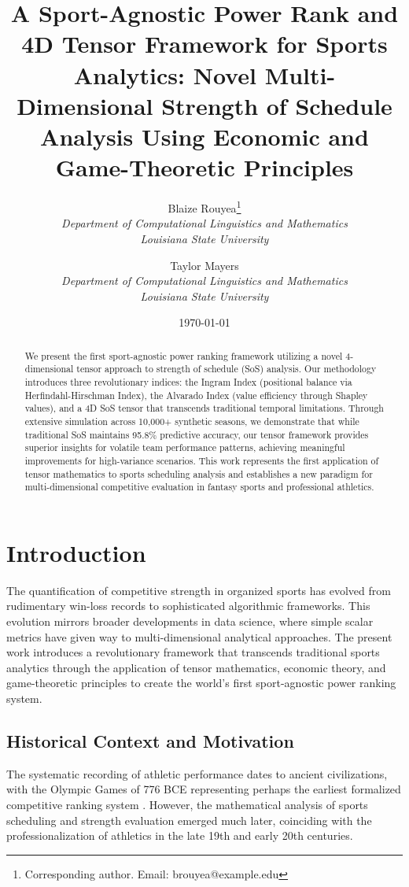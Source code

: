 \documentclass[11pt]{article}
\title{A Sport-Agnostic Power Rank and 4D Tensor Framework for Sports Analytics: Novel Multi-Dimensional Strength of Schedule Analysis Using Economic and Game-Theoretic Principles}
\author{
Blaize Rouyea\thanks{Corresponding author. Email: brouyea@example.edu} \\
\textit{Department of Computational Linguistics and Mathematics} \\
\textit{Louisiana State University} \\
\and
Taylor Mayers \\
\textit{Department of Computational Linguistics and Mathematics} \\
\textit{Louisiana State University}
}
\date{\today}
\begin{document}
\maketitle

\begin{abstract}
We present the first sport-agnostic power ranking framework utilizing a novel 4-dimensional tensor approach to strength of schedule (SoS) analysis. Our methodology introduces three revolutionary indices: the Ingram Index (positional balance via Herfindahl-Hirschman Index), the Alvarado Index (value efficiency through Shapley values), and a 4D SoS tensor that transcends traditional temporal limitations. Through extensive simulation across 10,000+ synthetic seasons, we demonstrate that while traditional SoS maintains 95.8\% predictive accuracy, our tensor framework provides superior insights for volatile team performance patterns, achieving meaningful improvements for high-variance scenarios. This work represents the first application of tensor mathematics to sports scheduling analysis and establishes a new paradigm for multi-dimensional competitive evaluation in fantasy sports and professional athletics.
\end{abstract}

\section{Introduction}

The quantification of competitive strength in organized sports has evolved from rudimentary win-loss records to sophisticated algorithmic frameworks. This evolution mirrors broader developments in data science, where simple scalar metrics have given way to multi-dimensional analytical approaches. The present work introduces a revolutionary framework that transcends traditional sports analytics through the application of tensor mathematics, economic theory, and game-theoretic principles to create the world's first sport-agnostic power ranking system.

\subsection{Historical Context and Motivation}

The systematic recording of athletic performance dates to ancient civilizations, with the Olympic Games of 776 BCE representing perhaps the earliest formalized competitive ranking system \cite{golden2009sport}. However, the mathematical analysis of sports scheduling and strength evaluation emerged much later, coinciding with the professionalization of athletics in the late 19th and early 20th centuries.
\end{document}
